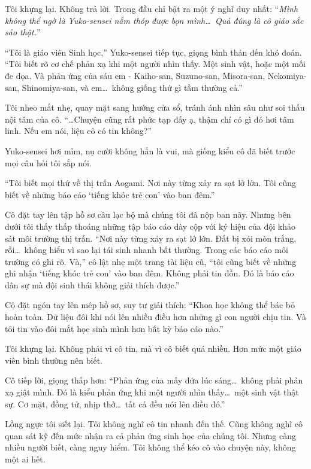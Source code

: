 \documentclass[../main.tex]{subfiles}
\begin{document}
Tôi khựng lại. Không trả lời. Trong đầu chỉ bật ra một ý nghĩ duy nhất: ``\textit{Mình không thể ngờ là Yuko-sensei nắm thóp được bọn mình\dots\ Quả đúng là cô giáo sắc sảo thật.}''

``Tôi là giáo viên Sinh học,'' Yuko-sensei tiếp tục, giọng bình thản đến khó đoán. ``Tôi biết rõ cơ chế phản xạ khi một người nhìn thấy. Một sinh vật, hoặc một mối đe dọa. Và phản ứng của sáu em - Kaiho-san, Suzuno-san, Misora-san, Nekomiya-san, Shinomiya-san, và em\dots\ không giống thứ gì tầm thường cả.''

Tôi nheo mắt nhẹ, quay mặt sang hướng cửa sổ, tránh ánh nhìn sâu như soi thấu nội tâm của cô. ``\dots Chuyện cũng rất phức tạp đấy ạ, thậm chí có gì đó hơi tâm linh. Nếu em nói, liệu cô có tin không?''

Yuko-sensei hơi mỉm, nụ cười không hẳn là vui, mà giống kiểu cô đã biết trước mọi câu hỏi tôi sắp nói.

``Tôi biết mọi thứ về thị trấn Aogami. Nơi này từng xảy ra sạt lở lớn. Tôi cũng biết về những báo cáo `tiếng khóc trẻ con' vào ban đêm.''

Cô đặt tay lên tập hồ sơ câu lạc bộ mà chúng tôi đã nộp ban nãy. Nhưng bên dưới tôi thấy thấp thoáng những tập báo cáo dày cộp với ký hiệu của đội khảo sát môi trường thị trấn.  ``Nơi này từng xảy ra sạt lở lớn. Đất bị xói mòn trắng, rồi\dots\ không hiểu vì sao lại tái sinh nhanh bất thường. Trong các báo cáo môi trường có ghi rõ. Và,'' cô lật nhẹ một trang tài liệu cũ, ``tôi cũng biết về những ghi nhận `tiếng khóc trẻ con' vào ban đêm. Không phải tin đồn. Đó là báo cáo dân sự mà đội sinh thái không giải thích được.''

Cô đặt ngón tay lên mép hồ sơ, suy tư giải thích: ``Khoa học không thể bác bỏ hoàn toàn. Dữ liệu đôi khi nói lên nhiều điều hơn những gì con người chịu tin. Và tôi tin vào đôi mắt học sinh mình hơn bất kỳ báo cáo nào.''

Tôi khựng lại. Không phải vì cô tin, mà vì cô biết quá nhiều. Hơn mức một giáo viên bình thường nên biết.

Cô tiếp lời, giọng thấp hơn: ``Phản ứng của mấy đứa lúc sáng\dots\ không phải phản xạ giật mình. Đó là kiểu phản ứng khi một người nhìn thấy\dots\ một sinh vật thật sự. Cơ mặt, đồng tử, nhịp thở\dots\ tất cả đều nói lên điều đó.''

Lồng ngực tôi siết lại. Tôi không nghĩ cô tin nhanh đến thế. Cũng không nghĩ cô quan sát kỹ đến mức nhận ra cả phản ứng sinh học của chúng tôi. Nhưng càng nhiều người biết, càng nguy hiểm. Tôi không thể kéo cô vào chuyện này, không một ai hết.
\end{document}
